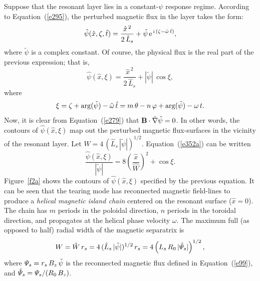 \documentclass[notitlepage,12pt]{article}
\begin{document}
Suppose that the resonant layer lies in a constant-$\psi$ response regime. According to Equation~(\ref{e295}),
the perturbed magnetic flux in the layer takes the form:
\begin{equation}
\hat{\psi}(\hat{x},\zeta,\hat{t}) = \frac{\hat{x}^{\,2} }{2\,\hat{L}_s}+ \tilde{\psi}\,{\rm e}^{\,{\rm i}\,(\zeta-\hat{\omega}\,\hat{t})},
\end{equation}
where $\tilde{\psi}$ is a complex constant. Of course, the physical flux is the real part of the previous expression; that is,
\begin{equation}\label{e352a}
\hat{\psi}(\hat{x},\xi)= \frac{\hat{x}^{\,2} }{2\,\hat{L}_s}+ |\tilde{\psi}|\,\cos\xi,
\end{equation}
where
\begin{equation}
\xi = \zeta +{\rm arg}(\tilde{\psi})-\hat{\omega}\,\hat{t} = m\,\theta-n\,\varphi +{\rm arg}(\tilde{\psi}) -\omega\,t.
\end{equation}
Now, it is clear from Equation~(\ref{e279}) that ${\bf B}\cdot\hat{\nabla}\hat{\psi}=0$. In other words, the contours of
$\hat{\psi}(\hat{x},\xi)$ map out the perturbed magnetic flux-surfaces in the vicinity of the resonant layer. 
Let $\hat{W} = 4\,(\hat{L}_s\,|\tilde{\psi}|)^{1/2}$. Equation~(\ref{e352a}) can be written
\begin{equation}
\frac{\hat{\psi}(\hat{x},\xi)}{|\tilde{\psi}|} = 8\left(\frac{\hat{x}}{\hat{W}}\right)^2 + \cos\xi.
\end{equation}
Figure~\ref{f2a} shows the contours of $\hat{\psi}(\hat{x},\xi)$ specified by the previous equation. It can be seen that the
tearing mode has reconnected magnetic field-lines to produce a {\em helical magnetic island chain}\/ centered on the resonant
surface ($\hat{x}=0$). The chain has $m$ periods in the poloidal direction, $n$ periods in the toroidal direction, and propagates at the helical phase velocity $\omega$. The maximum full (as opposed to half) radial width of the magnetic separatrix is 
\begin{equation}\label{e355s}
W =  \hat{W}\,r_s= 4\,(\hat{L}_s\,|\tilde{\psi}|)^{1/2}\,r_s = 4\left(L_s\,R_0\,|\hat{\mit\Psi}_s|\right)^{1/2},
\end{equation}
where ${\mit\Psi}_s = r_s\,B_z\,\tilde{\psi}$ is the reconnected magnetic flux defined in Equation~(\ref{e99}), and
$\hat{\mit\Psi}_s= {\mit\Psi}_s/(R_0\,B_z)$. 
\end{document}
